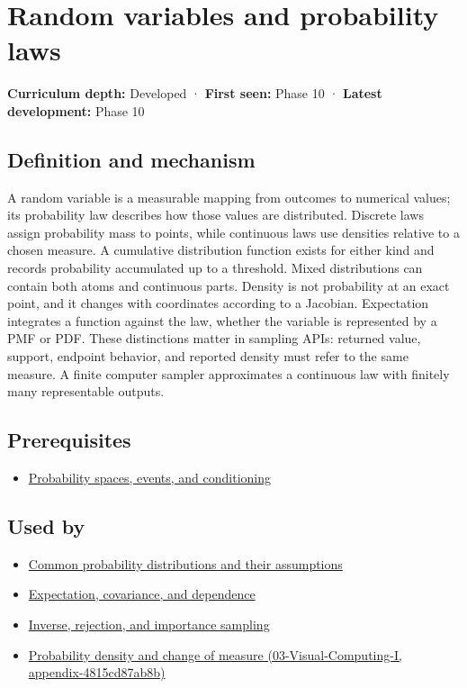 \hypertarget{appendix-4d0203f7944f}{}
\section{Random variables and probability laws}\label{appendix-4d0203f7944f-random-variables-and-probability-laws}

\textbf{Curriculum depth:} Developed · \textbf{First seen:} Phase 10 · \textbf{Latest development:} Phase 10

\subsection{Definition and mechanism}\label{appendix-4d0203f7944f-definition-and-mechanism}

A random variable is a measurable mapping from outcomes to numerical values; its probability law describes how those values are distributed. Discrete laws assign probability mass to points, while continuous laws use densities relative to a chosen measure. A cumulative distribution function exists for either kind and records probability accumulated up to a threshold. Mixed distributions can contain both atoms and continuous parts. Density is not probability at an exact point, and it changes with coordinates according to a Jacobian. Expectation integrates a function against the law, whether the variable is represented by a PMF or PDF. These distinctions matter in sampling APIs: returned value, support, endpoint behavior, and reported density must refer to the same measure. A finite computer sampler approximates a continuous law with finitely many representable outputs.

\subsection{Prerequisites}\label{appendix-4d0203f7944f-prerequisites}

\begin{itemize}
\tightlist
\item
  \hyperref[appendix-f1ef323f6ed7]{Probability spaces, events, and conditioning}
\end{itemize}

\subsection{Used by}\label{appendix-4d0203f7944f-used-by}

\begin{itemize}
\tightlist
\item
  \hyperref[appendix-a2360b435383]{Common probability distributions and their assumptions}
\item
  \hyperref[appendix-54c383df9992]{Expectation, covariance, and dependence}
\item
  \hyperref[appendix-8d863ed954d0]{Inverse, rejection, and importance sampling}
\item
  \href{../03-Visual-Computing-I/main.pdf\#nameddest=appendix-4815cd87ab8b}{Probability density and change of measure (03-Visual-Computing-I, appendix-4815cd87ab8b)}
\end{itemize}

